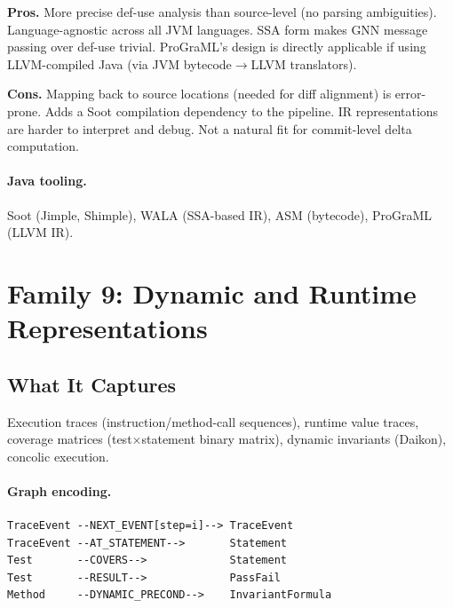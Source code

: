 \documentclass[12pt,a4paper]{article}
\begin{document}
\begin{prosbox}
\textbf{Pros.}
More precise def-use analysis than source-level (no parsing ambiguities).
Language-agnostic across all JVM languages. SSA form makes GNN message
passing over def-use trivial. ProGraML's design is directly applicable if
using LLVM-compiled Java (via JVM bytecode$\to$LLVM translators).
\end{prosbox}

\begin{consbox}
\textbf{Cons.}
Mapping back to source locations (needed for diff alignment) is error-prone.
Adds a Soot compilation dependency to the pipeline. IR representations are
harder to interpret and debug. Not a natural fit for commit-level delta
computation.
\end{consbox}

\paragraph{Java tooling.} Soot (Jimple, Shimple), WALA (SSA-based IR),
ASM (bytecode), ProGraML (LLVM IR).

\section{Family 9: Dynamic and Runtime Representations}

\subsection{What It Captures}

Execution traces (instruction/method-call sequences), runtime value traces,
coverage matrices (test$\times$statement binary matrix), dynamic invariants
(Daikon), concolic execution.

\paragraph{Graph encoding.}
\begin{lstlisting}
TraceEvent --NEXT_EVENT[step=i]--> TraceEvent
TraceEvent --AT_STATEMENT-->       Statement
Test       --COVERS-->             Statement
Test       --RESULT-->             PassFail
Method     --DYNAMIC_PRECOND-->    InvariantFormula
\end{lstlisting}
\end{document}
